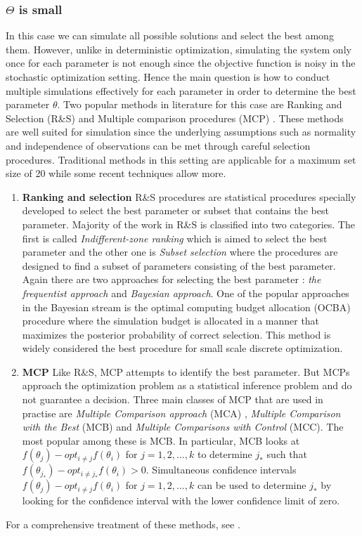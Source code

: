 \subsubsection{$\Theta$ is small}
In this case we can simulate all possible solutions and select the best among them. However, unlike in deterministic optimization, simulating the system only once for each parameter is not enough since the objective function is noisy in the stochastic optimization setting. Hence the main question is how to conduct multiple simulations effectively for each parameter in order to determine the  best parameter $\theta$.  Two popular methods in literature for this case are Ranking and Selection (R\&S)\cite{bech} and Multiple comparison procedures (MCP) \cite{mcp}. These methods are well suited for simulation since  the underlying assumptions such as normality and independence of observations can be met through careful selection procedures.
Traditional methods in this setting are applicable for a maximum set size of 20 while some recent techniques allow more. 
\begin{enumerate}

\item \textbf {Ranking and selection }
R\&S procedures are statistical procedures specially developed to select the best parameter or subset that contains the best parameter. Majority of the work in R\&S is classified into  two categories. The first  is called \emph{Indifferent-zone ranking}\cite{bech,izrs} which is aimed  to select the best parameter  and the other one is \emph{Subset selection}\cite{ssrs} where the procedures are designed to find a subset of parameters consisting of the best parameter. Again there are two approaches for selecting the best parameter : \emph{the frequentist approach} and \emph{ Bayesian approach}. One of the popular approaches in the  Bayesian stream is the optimal computing budget allocation (OCBA) procedure \cite{ocbabook,chen2000} where the simulation budget is allocated in a manner that maximizes the posterior probability of correct selection. This method is widely considered the best procedure for small scale discrete optimization.

\item \textbf {MCP}
Like R\&S, MCP attempts to identify the best parameter. But MCPs approach the optimization problem as a statistical inference problem and do not guarantee a decision. Three main classes of MCP that are used in practise are \emph{Multiple Comparison approach} (MCA) , \emph{Multiple Comparison with the Best} (MCB) and \emph{Multiple Comparisons with Control} (MCC). The most popular among these is MCB. In particular, MCB looks at $f(\theta_{j}) - opt_{i \neq j} f(\theta_{i})$ for $j = 1,2,\ldots,k$ to determine  $j_{*}$ such that $f(\theta_{j_{*}}) - opt_{ i \neq j_{*}} f(\theta_{i}) > 0$. Simultaneous confidence intervals $f(\theta_{j}) - opt_{i \neq j} f(\theta_{i})$ for $j = 1,2,\ldots,k$ can be used to determine $j_{*}$ by looking  for the confidence interval with the lower confidence limit of zero.
\end{enumerate}
For a comprehensive treatment of these methods, see \cite{swish,swish2}.
